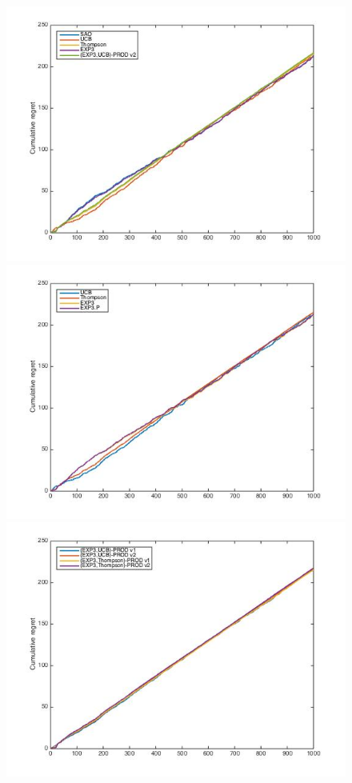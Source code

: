 \documentclass[10.5pt]{article}
\begin{document}
\begin{figure}[H]
  \includegraphics[width=\linewidth]{CStoch_mix.jpg}
  \label{fig:awesome_image1}
\endminipage\hfill
{}
  \includegraphics[width=\linewidth]{CStoch_old.jpg}
  \label{fig:awesome_image2}
\endminipage\hfill
{}%
  \includegraphics[width=\linewidth]{CStoch_prod.jpg}

\end{figure}
\end{document}
